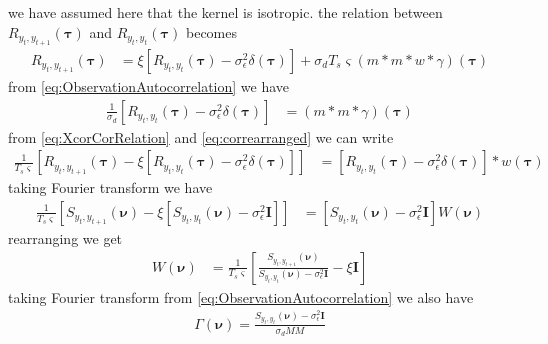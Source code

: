 \documentclass[]{article}
\begin{document}
 we have assumed here that the kernel is isotropic. the relation between $R_{y_{t},y_{t+1}}(\boldsymbol{\tau})$ and $R_{y_{t},y_{t}}(\boldsymbol{\tau})$ becomes
 \begin{align}
 	R_{y_{t},y_{t+1}}(\boldsymbol{\tau}) &= \xi \left[ R_{y_{t},y_{t}}(\boldsymbol{\tau})-\sigma_{\epsilon}^2\delta(\boldsymbol\tau)\right]+\sigma_d T_s\varsigma\left(m\ast m\ast w\ast\gamma\right)\left(\boldsymbol\tau\right)\label{eq:XcorCorRelation}
 \end{align}
from \eqref{eq:ObservationAutocorrelation} we have
\begin{align}
	\frac{1}{\sigma_d}\left[R_{y_{t},y_{t}}(\boldsymbol{\tau})-\sigma_{\epsilon}^2\delta(\boldsymbol\tau)\right] &=\left(m \ast m \ast \gamma\right)\left(\boldsymbol{\tau}\right)\label{eq:correarranged}
\end{align}
from \eqref{eq:XcorCorRelation} and \eqref{eq:correarranged} we can write
\begin{align}
 	\frac{1}{T_s\varsigma}\left[R_{y_{t},y_{t+1}}(\boldsymbol{\tau})- \xi \left[ R_{y_{t},y_{t}}(\boldsymbol{\tau})-\sigma_{\epsilon}^2\delta(\boldsymbol\tau)\right]\right]&= \left[R_{y_{t},y_{t}}(\boldsymbol{\tau})-\sigma_{\epsilon}^2\delta(\boldsymbol\tau)\right]\ast w\left(\boldsymbol\tau\right)
 \end{align}
taking Fourier transform we have
\begin{align}
 	\frac{1}{T_s\varsigma}\left[S_{y_{t},y_{t+1}}(\boldsymbol{\nu})- \xi \left[ S_{y_{t},y_{t}}(\boldsymbol{\nu})-\sigma_{\epsilon}^2\mathbf I\right]\right]&= \left[S_{y_{t},y_{t}}(\boldsymbol{\nu})-\sigma_{\epsilon}^2\mathbf I\right] W\left(\boldsymbol\nu\right)
 \end{align}
rearranging we get
\begin{align}
 	W\left(\boldsymbol\nu\right)&=\frac{1}{T_s\varsigma}\left[\frac{S_{y_{t},y_{t+1}}(\boldsymbol{\nu})}{S_{y_{t},y_{t}}(\boldsymbol{\nu})-\sigma_{\epsilon}^2\mathbf I}- \xi \mathbf I \right]
 \end{align}
taking Fourier transform from  \eqref{eq:ObservationAutocorrelation} we also have
\begin{align}
 \Gamma(\boldsymbol\nu)=\frac{S_{y_t,y_t}(\boldsymbol\nu)-\sigma_{\epsilon}^2 \mathbf I} {\sigma_d M  M}
\end{align}



\end{document}
